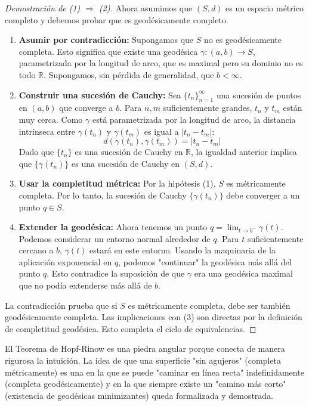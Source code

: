 \documentclass[12pt, a4paper]{report}
\theoremstyle{miestilo}
\theoremstyle{midefinicion}
\begin{document}
\begin{proof}[Demostración de (1) $\Rightarrow$ (2)]

Ahora asumimos que $(S,d)$ es un espacio métrico completo y debemos probar que es geodésicamente completo.
\begin{enumerate}
    \item \textbf{Asumir por contradicción:} Supongamos que $S$ no es geodésicamente completa. Esto significa que existe una geodésica $\gamma: (a,b) \to S$, parametrizada por la longitud de arco, que es maximal pero su dominio no es todo $\mathbb{R}$. Supongamos, sin pérdida de generalidad, que $b < \infty$.
    \item \textbf{Construir una sucesión de Cauchy:} Sea $\{t_n\}_{n=1}^\infty$ una sucesión de puntos en $(a,b)$ que converge a $b$. Para $n, m$ suficientemente grandes, $t_n$ y $t_m$ están muy cerca. Como $\gamma$ está parametrizada por la longitud de arco, la distancia intrínseca entre $\gamma(t_n)$ y $\gamma(t_m)$ es igual a $|t_n - t_m|$:
    $$d(\gamma(t_n), \gamma(t_m)) = |t_n - t_m|$$
    Dado que $\{t_n\}$ es una sucesión de Cauchy en $\mathbb{R}$, la igualdad anterior implica que $\{\gamma(t_n)\}$ es una sucesión de Cauchy en $(S,d)$.
    \item \textbf{Usar la completitud métrica:} Por la hipótesis (1), $S$ es métricamente completa. Por lo tanto, la sucesión de Cauchy $\{\gamma(t_n)\}$ debe converger a un punto $q \in S$.
    \item \textbf{Extender la geodésica:} Ahora tenemos un punto $q = \lim_{t \to b^-} \gamma(t)$. Podemos considerar un entorno normal alrededor de $q$. Para $t$ suficientemente cercano a $b$, $\gamma(t)$ estará en este entorno. Usando la maquinaria de la aplicación exponencial en $q$, podemos "continuar" la geodésica más allá del punto $q$. Esto contradice la suposición de que $\gamma$ era una geodésica maximal que no podía extenderse más allá de $b$.
\end{enumerate}
La contradicción prueba que si $S$ es métricamente completa, debe ser también geodésicamente completa. Las implicaciones con (3) son directas por la definición de completitud geodésica. Esto completa el ciclo de equivalencias.
\end{proof}

El Teorema de Hopf-Rinow es una piedra angular porque conecta de manera rigurosa la intuición. La idea de que una superficie "sin agujeros" (completa métricamente) es una en la que se puede "caminar en línea recta" indefinidamente (completa geodésicamente) y en la que siempre existe un "camino más corto" (existencia de geodésicas minimizantes) queda formalizada y demostrada.
\end{document}
